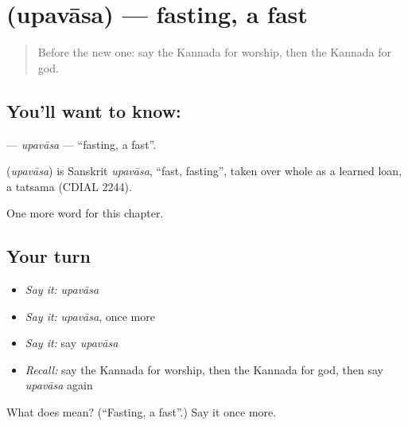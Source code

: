 \section[\texorpdfstring{\kn{ಉಪವಾಸ} (upavāsa)}{ಉಪವಾಸ (upavāsa)}]{ (upavāsa) — fasting, a fast}

\label{lesson:KA-C189-upavasa}



\begin{quote}
Before the new one: say the Kannada for worship, then the Kannada for god.
\end{quote}

\subsection*{You'll want to know: }
\textbf{} — \emph{upavāsa} — \textquotedblleft{}fasting, a fast\textquotedblright{}.

\begin{cousinweb}
\textbf{} (\emph{upavāsa}) is Sanskrit \emph{upavāsa}, \textquotedblleft{}fast, fasting\textquotedblright{}, taken over whole as a learned loan, a tatsama (CDIAL 2244).
\end{cousinweb}

\begin{grammarlens}[title={What you've built}]
One more word for this chapter.
\end{grammarlens}

\subsection*{Your turn}
\begin{itemize}
\raggedright
  \item \emph{Say it:} \emph{upavāsa}
  \item \emph{Say it:} \emph{upavāsa}, once more
  \item \emph{Say it:} say \emph{upavāsa}
  \item \emph{Recall:} say the Kannada for worship, then the Kannada for god, then say \emph{upavāsa} again
\end{itemize}

\begin{tcolorbox}[breakable,colback=teal!4,colframe=teal!35!black,title={Before you move on}]
What does  mean? (\textquotedblleft{}Fasting, a fast\textquotedblright{}.) Say it once more.
\end{tcolorbox}
